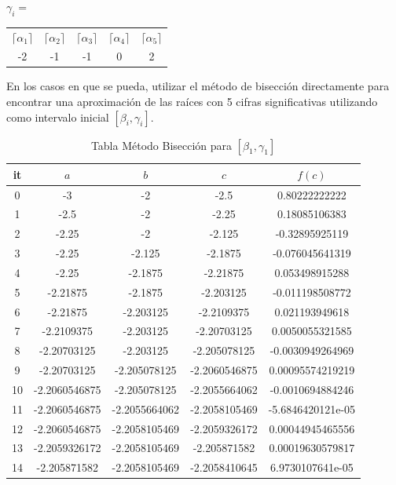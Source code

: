 \documentclass{article} %
\begin{document}
\begin{center}
$\gamma_i = $
\begin{tabular}{c c c c c}
    $\lceil \alpha_1 \rceil$ & $\lceil \alpha_2 \rceil$ & $\lceil \alpha_3 \rceil$ & $\lceil \alpha_4 \rceil$ & $\lceil \alpha_5 \rceil$ \\
     -2 & -1 & -1 & 0 & 2
\end{tabular}    
\end{center}

En los casos en que se pueda, utilizar el método de bisección directamente para encontrar una aproximación de las raíces con 5 cifras significativas utilizando como intervalo inicial $[\beta_i,\gamma_i]$.

\begin{table}[H]
    \centering
    \begin{tabular}{|c|c|c|c|c|}
    \hline
it & $a$ & $b$ & $c$ & $f(c)$\\
\hline
0 & -3 & -2 & -2.5 & 0.80222222222\\
1 & -2.5 & -2 & -2.25 & 0.18085106383\\
2 & -2.25 & -2 & -2.125 & -0.32895925119\\
3 & -2.25 & -2.125 & -2.1875 & -0.076045641319\\
4 & -2.25 & -2.1875 & -2.21875 & 0.053498915288\\
5 & -2.21875 & -2.1875 & -2.203125 & -0.011198508772\\
6 & -2.21875 & -2.203125 & -2.2109375 & 0.021193949618\\
7 & -2.2109375 & -2.203125 & -2.20703125 & 0.0050055321585\\
8 & -2.20703125 & -2.203125 & -2.205078125 & -0.0030949264969\\
9 & -2.20703125 & -2.205078125 & -2.2060546875 & 0.00095574219219\\
10 & -2.2060546875 & -2.205078125 & -2.2055664062 & -0.0010694884246\\
11 & -2.2060546875 & -2.2055664062 & -2.2058105469 & -5.6846420121e-05\\
12 & -2.2060546875 & -2.2058105469 & -2.2059326172 & 0.00044945465556\\
13 & -2.2059326172 & -2.2058105469 & -2.205871582 & 0.00019630579817\\
14 & -2.205871582 & -2.2058105469 & -2.2058410645 & 6.9730107641e-05\\
\hline
\end{tabular}
    \caption{Tabla Método Bisección para $[\beta_1,\gamma_1]$}
    \label{tab:my_label}
\end{table}
\end{document}
